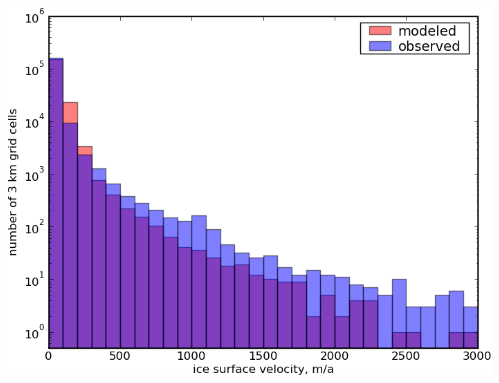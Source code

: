 \documentclass{beamer}
\begin{document}
\begin{frame}
\begin{columns}
\begin{column}{0.33\textwidth}
\begin{center}
\end{center}
\end{column}
\begin{column}{0.33\textwidth}
\begin{center}
  \includegraphics[width=1.0\textwidth]{g3km_3_25_99_hist}
\end{center}
\end{column}
\end{columns}
\end{frame}
\end{document}
